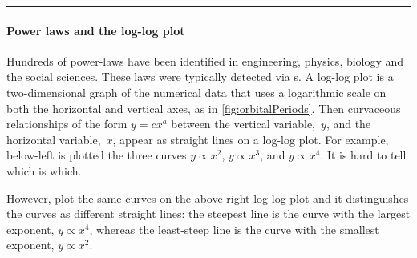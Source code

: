 \begin{table}
\hrule
\begin{minipage}{\linewidth}
\paragraph{Power laws and the log-log plot}
Hundreds of power-laws have been identified in engineering, physics, biology and the social sciences.
These laws were typically detected via s.
A log-log plot is a two-dimensional graph of the numerical data that uses a logarithmic scale on both the horizontal and vertical axes, as in \autoref{fig:orbitalPeriods}.
Then curvaceous relationships of the form $y=cx^a$ between the vertical variable,~$y$, and the horizontal variable,~$x$, appear as straight lines on a log-log plot.
For example, below-left is plotted the three curves $y\propto x^2$,  $y\propto x^3$, and  $y\propto x^4$.
It is hard to tell which is which.
\begin{center} 
 \hfil
{} 
\end{center}
However, plot the same curves on the above-right log-log plot and it  distinguishes the curves as different straight lines: the steepest line is the curve with the largest exponent, $y\propto x^4$, whereas the least-steep line is the curve with the smallest exponent, $y\propto x^2$.


\end{minipage}
\end{table}
